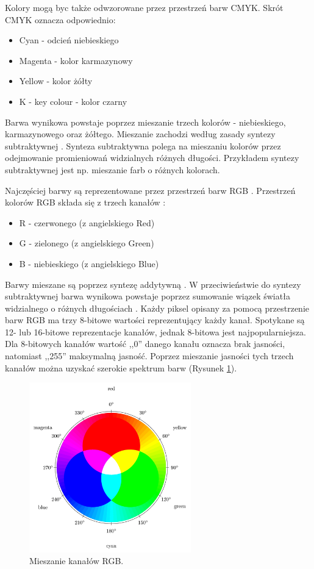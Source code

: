 \documentclass[a4paper,twoside,12pt]{book}
\begin{document}
    Kolory mogą byc także odwzorowane przez przestrzeń barw CMYK.
    Skrót CMYK oznacza odpowiednio:
    \begin{itemize}
        \item Cyan - odcień niebieskiego
        \item Magenta - kolor karmazynowy
        \item Yellow - kolor żółty
        \item K - key colour - kolor czarny
    \end{itemize}
    Barwa wynikowa powstaje poprzez mieszanie trzech kolorów - niebieskiego, karmazynowego oraz żółtego.
    Mieszanie zachodzi według zasady syntezy subtraktywnej \cite{przestrzenieKolorow}.
    Synteza subtraktywna polega na mieszaniu kolorów przez odejmowanie promieniowań widzialnych różnych długości.
    Przykładem syntezy subtraktywnej jest np. mieszanie farb o różnych kolorach.

    Najczęściej barwy są reprezentowane przez przestrzeń barw RGB \cite{przestrzenieKolorow}.
    Przestrzeń kolorów RGB składa się z trzech kanałów
    \cite{kolory}:

    \begin{itemize}
        \item R - czerwonego (z angielskiego Red)
        \item G - zielonego (z angielskiego Green)
        \item B - niebieskiego (z angielskiego Blue)
    \end{itemize}
    Barwy mieszane są poprzez syntezę addytywną .
    W przeciwieństwie do syntezy subtraktywnej barwa wynikowa powstaje poprzez sumowanie wiązek światła widzialnego o
    różnych długościach \cite{przestrzenieKolorow}.
    Każdy piksel opisany za pomocą przestrzenie barw RGB ma trzy 8-bitowe wartości reprezentujący każdy kanał.
    Spotykane
    są 12- lub 16-bitowe reprezentacje kanałów, jednak 8-bitowa jest najpopularniejsza.
    Dla 8-bitowych kanałów
    wartość ,,0''
    danego kanału oznacza brak jasności, natomiast ,,255'' maksymalną jasność.
    Poprzez mieszanie jasności tych trzech kanałów
    można uzyskać szerokie spektrum barw (Rysunek \ref{fig.mieszanieKolorow}).

    \begin{figure}
        \centering
        \includegraphics[width=7cm]{Obrazy/mieszanieKolorow.jpg}
        \caption{Mieszanie kanałów RGB. \cite{colorMixing}}
        \label{fig.mieszanieKolorow}
    \end{figure}
\end{document}
